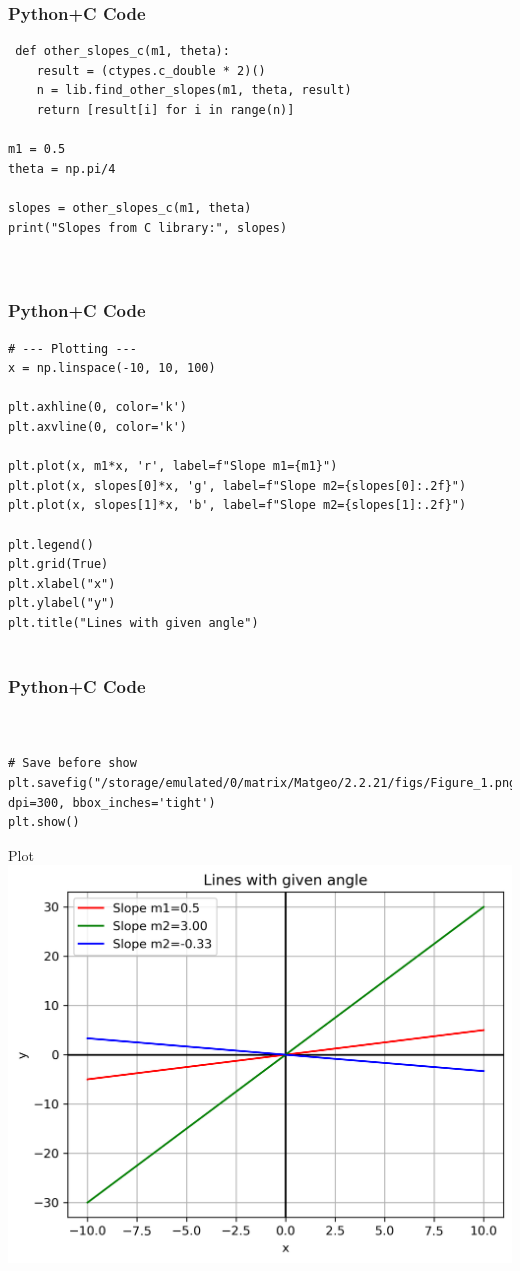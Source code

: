 \documentclass{beamer}
\begin{document}
\begin{frame}[fragile]
    \frametitle{Python+C Code}
    \begin{lstlisting}
 def other_slopes_c(m1, theta):
    result = (ctypes.c_double * 2)()
    n = lib.find_other_slopes(m1, theta, result)
    return [result[i] for i in range(n)]

m1 = 0.5
theta = np.pi/4

slopes = other_slopes_c(m1, theta)
print("Slopes from C library:", slopes)



    \end{lstlisting}
\end{frame}

\begin{frame}[fragile]
    \frametitle{Python+C Code}
    \begin{lstlisting}
# --- Plotting ---
x = np.linspace(-10, 10, 100)

plt.axhline(0, color='k')
plt.axvline(0, color='k')

plt.plot(x, m1*x, 'r', label=f"Slope m1={m1}")
plt.plot(x, slopes[0]*x, 'g', label=f"Slope m2={slopes[0]:.2f}")
plt.plot(x, slopes[1]*x, 'b', label=f"Slope m2={slopes[1]:.2f}")

plt.legend()
plt.grid(True)
plt.xlabel("x")
plt.ylabel("y")
plt.title("Lines with given angle")


    \end{lstlisting}
\end{frame}


\begin{frame}[fragile]
    \frametitle{Python+C Code}
    \begin{lstlisting}


# Save before show
plt.savefig("/storage/emulated/0/matrix/Matgeo/2.2.21/figs/Figure_1.png", dpi=300, bbox_inches='tight')
plt.show()
    \end{lstlisting}
\end{frame}


\begin{frame}{Plot}
    \centering
    \includegraphics[width=\columnwidth, height=0.8\textheight, keepaspectratio]{figs/figure_1.png}     
\end{frame}
\end{document}
